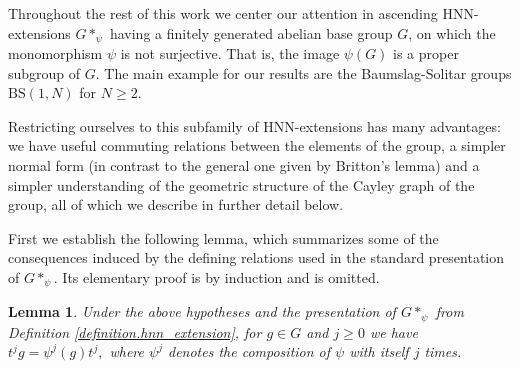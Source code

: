 \documentclass[letterpaper,11pt,reqno]{amsart}
\theoremstyle{plain}
\newtheorem{lemma}[theorem]{Lemma}
\theoremstyle{definition}
\theoremstyle{cupremark}
\begin{document}
Throughout the rest of this work we center our attention in ascending HNN-extensions $G*_{\psi}$ having a finitely generated abelian base group $G$, on which the monomorphism $\psi$ is not surjective. That is, the image $\psi(G)$ is a proper subgroup of $G$. The main example for our results are the Baumslag-Solitar groups $\mathrm{BS}(1,N)$ for $N\ge 2$.

Restricting ourselves to this subfamily of HNN-extensions has many advantages: we have useful commuting relations between the elements of the group, a simpler normal form (in contrast to the general one given by Britton's lemma) and a simpler understanding of the geometric structure of the Cayley graph of the group, all of which we describe in further detail below.

First we establish the following lemma, which summarizes some of the consequences induced by the defining relations used in the standard presentation of $G*_{\psi}$. Its elementary proof is by induction and is omitted.

\begin{lemma}\label{lemma:ascending_hnn_further_identifications}
	Under the above hypotheses and the presentation of $G*_{\psi}$ from Definition \ref{definition.hnn_extension}, for $g\in G$ and $j\ge 0$ we have $	t^jg=\psi^j(g)t^j,$ where $\psi^j$ denotes the composition of $\psi$ with itself $j$ times.
\end{lemma}
\end{document}
